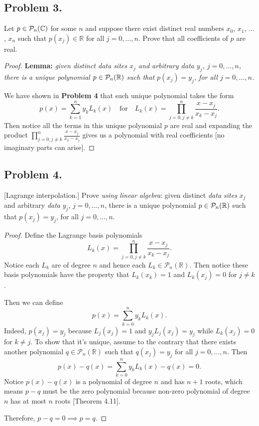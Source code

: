 \documentclass{article}
\begin{document}
\newpage
\subsection*{Problem 3.}
Let $p\in {\cal P}_n(\mathbb{C})$ for some $n$ and suppose there exist distinct real numbers 
$x_0$, $x_1$, $\ldots$, $x_n$ such that $p(x_j)\in \mathbb{R}$ for all $j=0, \ldots, n$. 
Prove that all coefficients of $p$ are real.
\begin{proof}
    \textbf{Lemma:} \emph{given distinct {\it data sites} $x_j$ 
    and arbitrary {\it data} $y_j$, $j=0,\ldots, n$, there is a unique polynomial  $p\in {\cal P}_n(\mathbb{R})$ 
    such that $p(x_j)=y_j$, for all $j=0,\ldots, n$.}

    We have shown in \textbf{Problem 4} that such unique polynomial takes the form 
    $$p(x)=\sum_{k=1}^{n}y_kL_k(x)\quad \text{for}\quad L_k(x)=\prod_{j=0,j\neq k}^{n}\frac{x-x_j}{x_k-x_j}.$$
    Then notice all the terms in this unique polynomial $p$ are real and expanding the product 
    $\prod_{j=0,j\neq k}^{n}\frac{x-x_j}{x_k-x_j}$ gives us a polynomial with real coefficients 
    [no imaginary parts can arise].
\end{proof}

\newpage
\subsection*{Problem 4.}
[Lagrange interpolation.] Prove {\it using linear algebra}: given distinct {\it data sites} $x_j$ 
and arbitrary {\it data} $y_j$, $j=0,\ldots, n$, there is a unique polynomial  $p\in {\cal P}_n(\mathbb{R})$ 
such that $p(x_j)=y_j$, for all $j=0,\ldots, n$. 
\begin{proof}
    Define the Lagrange basis polynomials 
    $$L_k(x)=\prod_{j=0,j\neq k}^{n}\frac{x-x_j}{x_k-x_j}.$$
    Notice each $L_k$ are of degree $n$ and hence each $L_k\in\mathcal{P}_n(\mathbb{R})$.
    Then notice these basis polynomials have the property that $L_k(x_k)=1$ and $L_k(x_j)=0$ for 
    $j\neq k$. 
    
    Then we can define 
    $$p(x)=\sum_{k=0}^{n}y_kL_k(x).$$
    Indeed, $p(x_j)=y_j$ because $L_j(x_j)=1$ and $y_jL_j(x_j)=y_j$ while $L_k(x_j)=0$ for $k\neq j$.
    To show that it's unique, assume to the contrary that there exists another polynomial
    $q\in\mathcal{P}_n(\mathbb{R})$ such that $q(x_j)=y_j$ for all $j=0,\ldots,n$. Then
    $$p(x)-q(x)=\sum_{k=0}^{n}y_kL_k(x)-q(x)=0.$$
    Notice $p(x)-q(x)$ is a polynomial of degree $n$ and has $n+1$ roots, which means 
    $p-q$ must be the zero polynomial because non-zero polynomial of degree $n$ has at most $n$ roots
    [Theorem 4.11].

    Therefore, $p-q=0\implies p=q$.
\end{proof}
\end{document}

